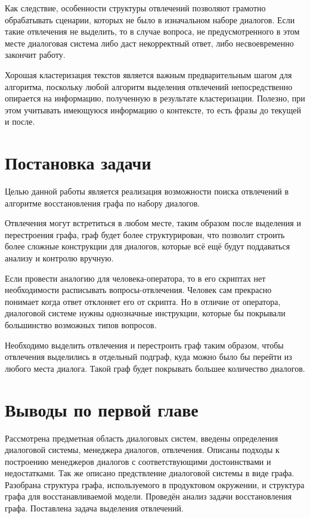 \documentclass[times,specification,annotation]{itmo-student-thesis}
\begin{document}
	Как следствие, особенности структуры отвлечений позволяют грамотно обрабатывать сценарии, которых не было в изначальном наборе диалогов. Если такие отвлечения не выделить, то в случае вопроса, не предусмотренного в этом месте диалоговая система либо даст некорректный ответ, либо несвоевременно закончит работу.
	
	Хорошая кластеризация текстов является важным предварительным шагом для алгоритма, поскольку любой алгоритм выделения отвлечений непосредственно опирается на информацию, полученную в результате кластеризации. Полезно, при этом учитывать имеющуюся информацию о контексте, то есть фразы до текущей и после.
	
	
	\section{Постановка задачи}
	Целью данной работы является реализация возможности поиска отвлечений в алгоритме восстановления графа по набору диалогов.

	Отвлечения могут встретиться в любом месте, таким образом после выделения и перестроения графа, граф будет более структурирован, что позволит строить более сложные конструкции для диалогов, которые всё ещё будут поддаваться анализу и контролю вручную.
	
	Если провести аналогию для человека-оператора, то в его скриптах нет необходимости расписывать вопросы-отвлечения. Человек сам прекрасно понимает когда ответ отклоняет его от скрипта. Но в отличие от оператора, диалоговой системе нужны однозначные инструкции, которые бы покрывали большинство возможных типов вопросов.
	
	Необходимо выделить отвлечения и перестроить граф таким образом, чтобы отвлечения выделились в отдельный подграф, куда можно было бы перейти из любого места диалога. Такой граф будет покрывать большее количество диалогов.
	
	\section{Выводы по первой главе}
	Рассмотрена предметная область диалоговых систем, введены определения диалоговой системы, менеджера диалогов, отвлечения. Описаны подходы к построению менеджеров диалогов с соответствующими достоинствами и недостатками. Так же описано предствление диалоговой системы в виде графа. Разобрана структура графа, используемого в продуктовом окружении, и структура графа для восстанавливаемой модели. Проведён анализ задачи восстановления графа. Поставлена задача выделения отвлечений. 
	
\end{document}
